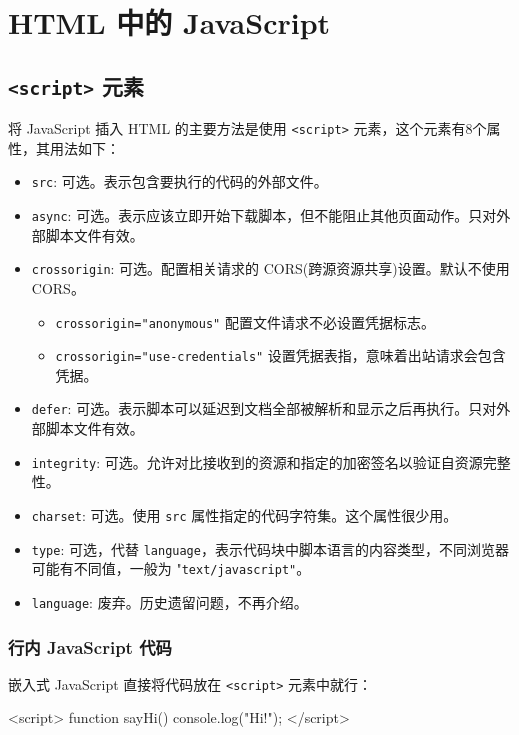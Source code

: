 \section{HTML 中的 JavaScript}
\subsection{\texttt{<script>} 元素}
 
将 JavaScript 插入 HTML 的主要方法是使用 \texttt{<script>} 元素，这个元素有8个属性，其用法如下：
\begin{itemize}
    \item \texttt{src}: 可选。表示包含要执行的代码的外部文件。
    \item \texttt{async}: 可选。表示应该立即开始下载脚本，但不能阻止其他页面动作。只对外部脚本文件有效。
    \item \texttt{crossorigin}: 可选。配置相关请求的 CORS(跨源资源共享)设置。默认不使用 CORS。
    \begin{itemize}
        \item \texttt{crossorigin="anonymous"} 配置文件请求不必设置凭据标志。
        \item \texttt{crossorigin="use-credentials"} 设置凭据表指，意味着出站请求会包含凭据。
    \end{itemize}
    \item \texttt{defer}: 可选。表示脚本可以延迟到文档全部被解析和显示之后再执行。只对外部脚本文件有效。
    \item \texttt{integrity}: 可选。允许对比接收到的资源和指定的加密签名以验证自资源完整性。
    \item \texttt{charset}: 可选。使用 \texttt{src} 属性指定的代码字符集。这个属性很少用。
    \item \texttt{type}: 可选，代替 \texttt{language}，表示代码块中脚本语言的内容类型，不同浏览器可能有不同值，一般为 "\texttt{text/javascript"}。
    \item \texttt{language}: 废弃。历史遗留问题，不再介绍。
\end{itemize}

\subsubsection{行内 JavaScript 代码}

嵌入式 JavaScript 直接将代码放在 \texttt{<script>} 元素中就行：

\begin{HTML}
<script>
    function sayHi() {
        console.log("Hi!");
    }
</script>
\end{HTML}

